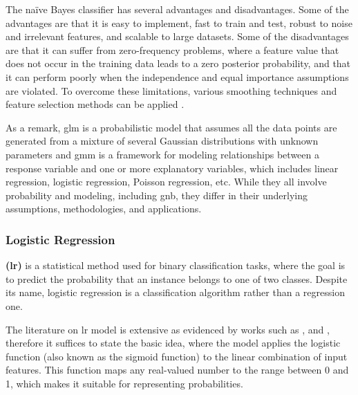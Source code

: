 The naïve Bayes classifier has several advantages and disadvantages. Some of the advantages are that it is easy to implement, fast to train and test, robust to noise and irrelevant features, and scalable to large datasets. Some of the disadvantages are that it can suffer from zero-frequency problems, where a feature value that does not occur in the training data leads to a zero posterior probability, and that it can perform poorly when the independence and equal importance assumptions are violated. To overcome these limitations, various smoothing techniques and feature selection methods can be applied \cite{Wickramasinghe2021}.

As a remark, \gls{glm} is a probabilistic model that assumes all the data points are generated from a mixture of several Gaussian distributions with unknown parameters and \gls{gmm} is a framework for modeling relationships between a response variable and one or more explanatory variables, which includes linear regression, logistic regression, Poisson regression, etc. While they all involve probability and modeling, including \gls{gnb}, they differ in their underlying assumptions, methodologies, and applications.


\subsubsection{Logistic Regression}
\label{subsubsec:machine_learning_logistic_regrassion}

\textbf{ (\gls{lr})} is a statistical method used for binary classification tasks, where the goal is to predict the probability that an instance belongs to one of two classes. Despite its name, logistic regression is a classification algorithm rather than a regression one.

The literature on \gls{lr} model is extensive as evidenced by works such as \cite{Mitchell1997}, \cite{Bouguila2020} and \cite{Russel2010}, therefore it suffices to state the basic idea, where the model applies the logistic function (also known as the sigmoid function) to the linear combination of input features. This function maps any real-valued number to the range between 0 and 1, which makes it suitable for representing probabilities. %


